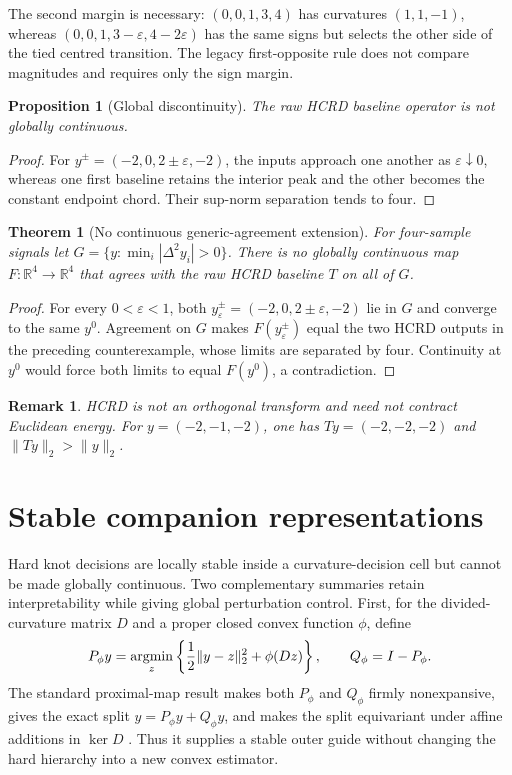 \documentclass[review,onefignum,onetabnum]{siamonline250211}
\providecommand{\citep}[1]{\cite{#1}}
\newtheorem{theorem}{Theorem}
\newtheorem{proposition}{Proposition}
\newtheorem{remark}{Remark}
\begin{document}
The second margin is necessary: $(0,0,1,3,4)$ has curvatures $(1,1,-1)$,
whereas $(0,0,1,3-\varepsilon,4-2\varepsilon)$ has the same signs but selects
the other side of the tied centred transition.  The legacy first-opposite rule
does not compare magnitudes and requires only the sign margin.

\begin{proposition}[Global discontinuity]
The raw HCRD baseline operator is not globally continuous.
\end{proposition}
\begin{proof}
For $y^\pm=(-2,0,2\pm\varepsilon,-2)$, the inputs approach one another as
$\varepsilon\downarrow0$, whereas one first baseline retains the interior peak
and the other becomes the constant endpoint chord.  Their sup-norm separation
tends to four.
\end{proof}

\begin{theorem}[No continuous generic-agreement extension]
\label{thm:impossibility}
For four-sample signals let
$G=\{y:\min_i|\Delta^2y_i|>0\}$.  There is no globally continuous map
$F:\mathbb R^4\to\mathbb R^4$ that agrees with the raw HCRD baseline $T$ on
all of $G$.
\end{theorem}
\begin{proof}
For every $0<\varepsilon<1$, both
$y^\pm_\varepsilon=(-2,0,2\pm\varepsilon,-2)$ lie in $G$ and converge to the
same $y^0$.  Agreement on $G$ makes $F(y^\pm_\varepsilon)$ equal the two HCRD
outputs in the preceding counterexample, whose limits are separated by four.
Continuity at $y^0$ would force both limits to equal $F(y^0)$, a contradiction.
\end{proof}

\begin{remark}
HCRD is not an orthogonal transform and need not contract Euclidean energy.  For
$y=(-2,-1,-2)$, one has $Ty=(-2,-2,-2)$ and $\|Ty\|_2>\|y\|_2$.
\end{remark}

\ifdefined\SPsubmission
\section{Stable companion representations}
Hard knot decisions are locally stable inside a curvature-decision cell but
cannot be made globally continuous.  Two complementary summaries retain
interpretability while giving global perturbation control.  First, for the
divided-curvature matrix $D$ and a proper closed convex function $\phi$, define
\begin{equation}
P_\phi y=\mathop{\rm argmin}_z
\left\{\frac12\|y-z\|_2^2+\phi(Dz)\right\},\qquad Q_\phi=I-P_\phi .
\end{equation}
The standard proximal-map result makes both $P_\phi$ and $Q_\phi$ firmly
nonexpansive, gives the exact split $y=P_\phi y+Q_\phi y$, and makes the split
equivariant under affine additions in $\ker D$ \citep{parikh2014proximal}.
Thus it supplies a stable outer guide without changing the hard hierarchy into
a new convex estimator.
\end{document}
